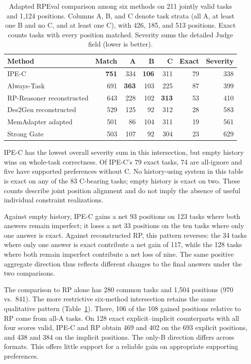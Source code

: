 \documentclass[11pt]{article}
\begin{document}
\begin{table}[t]
\centering
\small
\begin{tabular}{@{}lrrrrrr@{}}
\toprule
Method & Match & A & B & C & Exact & Severity\\
\midrule
IPE-C & \textbf{751} & 334 & \textbf{106} & 311 & 79 & 338\\
Always-Task & 691 & \textbf{363} & 103 & 225 & 87 & 399\\
RP-Reasoner reconstructed & 643 & 228 & 102 & \textbf{313} & 53 & 410\\
Des2Gen reconstructed & 529 & 125 & 92 & 312 & 28 & 583\\
MemAdapter adapted & 501 & 86 & 104 & 311 & 19 & 561\\
Strong Gate & 503 & 107 & 92 & 304 & 23 & 629\\
\bottomrule
\end{tabular}
\caption{Adapted RPEval comparison among six methods on 211 jointly valid tasks and 1,124 positions. Columns A, B, and C denote task strata (all A, at least one B and no C, and at least one C), with 426, 185, and 513 positions. Exact counts tasks with every position matched. Severity sums the detailed Judge field (lower is better).}
\label{tab:external}
\end{table}

IPE-C has the lowest overall severity sum in this intersection, but empty history wins on whole-task correctness. Of IPE-C's 79 exact tasks, 74 are all-ignore and five have supported preferences without C. No history-using system in this table is exact on any of the 83 C-bearing tasks; empty history is exact on two. These counts describe joint position alignment and do not imply the absence of useful individual constraint realizations.


Against empty history, IPE-C gains a net 93 positions on 123 tasks where both answers remain imperfect; it loses a net 33 positions on the ten tasks where only one answer is exact. Against reconstructed RP, this pattern reverses: the 34 tasks where only one answer is exact contribute a net gain of 117, while the 128 tasks where both remain imperfect contribute a net loss of nine. The same positive aggregate direction thus reflects different changes to the final answers under the two comparisons.

The comparison to RP alone has 280 common tasks and 1,504 positions (970 vs.\ 841). The more restrictive six-method intersection retains the same qualitative pattern (Table~\ref{tab:external}). There, 106 of the 108 gained positions relative to RP come from all-A tasks. On 128 exact explicit--implicit counterparts with all four scores valid, IPE-C and RP obtain 469 and 402 on the 693 explicit positions, and 438 and 384 on the implicit positions. The only-B direction differs across formats. This offers little support for a reliable gain on appropriate supporting preferences.
\end{document}
